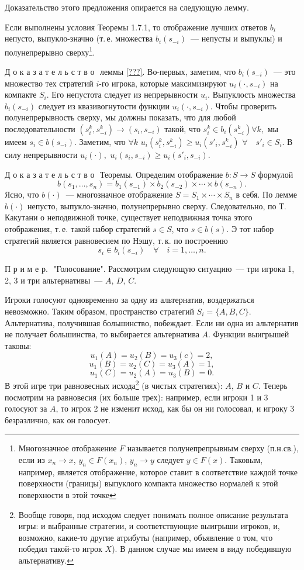 \documentclass[12pt]{article}
\begin{document}
{Доказательство этого предложения опирается на следующую лемму.

\begin{lemma} \label{???}
Если выполнены условия Теоремы 1.7.1, то отображение лучших ответов
$b_i$ непусто, выпукло-значно (т.\,е. множества $b_i(s_{-i})$~---
непусты и выпуклы) и полунепрерывно сверху\footnote{ Многозначное
отображение $F$ называется полунепрепрывным сверху (п.н.св.), если
из $x_n\to x$, $y_n\in F(x_n)$, $y_n\to y$ следует $y\in F(x)$.
Таковым, например, является отображение, которое ставит в соответствие
каждой точке поверхности (границы) выпуклого компакта множество нормалей
к этой поверхности в этой точке}.
\end{lemma}

Д о к а з а т е л ь с т в о\,\, леммы \ref{???}. Во-первых,
заметим, что $b_i(s_{-i})$~---  это множество тех стратегий $i$-го
игрока, которые максимизируют $u_i(\cdot,s_{-i})$ на компакте $S_i.$
Его непустота следует из непрерывности $u_i.$ Выпуклость множества
$b_i(s_{-i})$ следует из квазивогнутости функции
$u_i(\cdot,s_{-i}).$ Чтобы проверить полунепрерывность сверху, мы
должны показать, что для любой последовательности $(s^k_i,s^k_{- i})
\to(s_i,s_{-i})$ такой, что $s^k_i\in b_i(s^k_{-i})\forall k,$ мы
имеем $s_i\in b(s_{-i})$. Заметим, что $\forall k$
$u_i(s^k_i,s^k_{-i})\ge u_i(s'_i,s^k_{-i})$ $\forall\quad s'_i \in
S_i$. В силу непрерывности $u_i(\cdot),$ $u_i(s_i,s_{-i})\ge
u_i(s'_i, s_{-i})$.

Д о к а з а т е л ь с т в о\,\,  Теоремы. Определим отображение
$b:S\to S$ формулой
$$
b(s_1,\ldots,s_n)=b_1(s_{-1})\times b_2(s_{-2})\times\cdots\times
b(s_{-n}).
$$
Ясно, что $b(\cdot)$~--- многозначное отображение
$S=S_1\times\cdots\times S_n$ в себя. По лемме $b(\cdot)$ непусто,
выпукло-значно, полунепрерывно сверху. Следовательно, по
Т.\,Какутани о неподвижной точке, существует неподвижная точка
этого отображения, т.\,е. такой набор стратегий $s\in S$, что $s\in b(s)$. Э
тот набор стратегий является равновесием по Нэшу, т.\,к. по построению
$$
s_i\in b_i(s_{-i})\quad\forall\quad i=1,\ldots,n.
$$
\smallskip

П р и м е р.\,\, "Голосование". Рассмотрим следующую ситуацию~---
три игрока 1, 2, 3 и три альтернативы~--- $A$, $D$, $C$.

Игроки голосуют одновременно за одну из альтернатив, воздержаться
невозможно. Таким образом, пространство стратегий $S_i=\{A,B,C\}$.
Альтернатива, получившая большинство, побеждает.  Если ни одна из
альтернатив не получает большинства, то выбирается альтернатива $A$.
Функции выигрышей таковы:
$$
u_1(A)=u_2(B)=u_3(c)=2,
$$
$$
u_1(B)=u_2(C)=u_3(A)=1,
$$
$$
u_1(C)=u_2(A)=u_3(B)=0.
$$
В этой игре три равновесных исхода\footnote{ Вообще говоря, под
исходом следует понимать полное описание результата игры: и
выбранные стратегии, и соответствующие выигрыши игроков, и,
возможно, какие-то другие атрибуты (например, объявление о том, что
победил такой-то игрок $X$). В данном случае мы имеем в виду
победившую альтернативу.} (в чистых стратегиях): $A$, $B$  и $C$.
Теперь посмотрим на равновесия (их больше трех): например, если игроки 1 и 3
голосуют за $A$, то игрок 2 не изменит исход, как бы он ни
голосовал, и игроку 3 безразлично, как он голосует.

}
\end{document}
